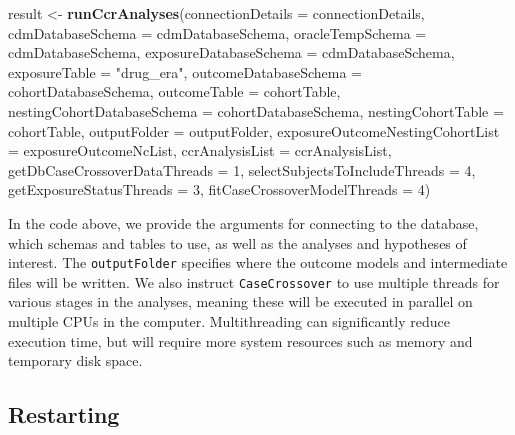 \documentclass[]{article}
\newenvironment{Shaded}{\begin{snugshade}}{\end{snugshade}}
\newcommand{\DataTypeTok}[1]{\textcolor[rgb]{0.13,0.29,0.53}{#1}}
\newcommand{\DecValTok}[1]{\textcolor[rgb]{0.00,0.00,0.81}{#1}}
\newcommand{\KeywordTok}[1]{\textcolor[rgb]{0.13,0.29,0.53}{\textbf{#1}}}
\newcommand{\NormalTok}[1]{#1}
\newcommand{\StringTok}[1]{\textcolor[rgb]{0.31,0.60,0.02}{#1}}
\begin{document}
\begin{Shaded}
\begin{Highlighting}[]
\NormalTok{result <-}\StringTok{ }\KeywordTok{runCcrAnalyses}\NormalTok{(}\DataTypeTok{connectionDetails =}\NormalTok{ connectionDetails,}
                        \DataTypeTok{cdmDatabaseSchema =}\NormalTok{ cdmDatabaseSchema,}
                        \DataTypeTok{oracleTempSchema =}\NormalTok{ cdmDatabaseSchema,}
                        \DataTypeTok{exposureDatabaseSchema =}\NormalTok{ cdmDatabaseSchema,}
                        \DataTypeTok{exposureTable =} \StringTok{"drug_era"}\NormalTok{,}
                        \DataTypeTok{outcomeDatabaseSchema =}\NormalTok{ cohortDatabaseSchema,}
                        \DataTypeTok{outcomeTable =}\NormalTok{ cohortTable,}
                        \DataTypeTok{nestingCohortDatabaseSchema =}\NormalTok{ cohortDatabaseSchema,}
                        \DataTypeTok{nestingCohortTable =}\NormalTok{ cohortTable,}
                        \DataTypeTok{outputFolder =}\NormalTok{ outputFolder,}
                        \DataTypeTok{exposureOutcomeNestingCohortList =}\NormalTok{ exposureOutcomeNcList,}
                        \DataTypeTok{ccrAnalysisList =}\NormalTok{ ccrAnalysisList,}
                        \DataTypeTok{getDbCaseCrossoverDataThreads =} \DecValTok{1}\NormalTok{,}
                        \DataTypeTok{selectSubjectsToIncludeThreads =} \DecValTok{4}\NormalTok{,}
                        \DataTypeTok{getExposureStatusThreads =} \DecValTok{3}\NormalTok{,}
                        \DataTypeTok{fitCaseCrossoverModelThreads =} \DecValTok{4}\NormalTok{)}
\end{Highlighting}
\end{Shaded}

In the code above, we provide the arguments for connecting to the
database, which schemas and tables to use, as well as the analyses and
hypotheses of interest. The \texttt{outputFolder} specifies where the
outcome models and intermediate files will be written. We also instruct
\texttt{CaseCrossover} to use multiple threads for various stages in the
analyses, meaning these will be executed in parallel on multiple CPUs in
the computer. Multithreading can significantly reduce execution time,
but will require more system resources such as memory and temporary disk
space.

\hypertarget{restarting}{%
\subsection{Restarting}\label{restarting}}
\end{document}
